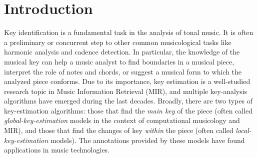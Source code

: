 \documentclass[sigconf]{acmart}
\begin{document}



\maketitle

\section{Introduction}
Key identification is a fundamental task in the analysis of tonal music. 
It is often a preliminary or concurrent step to other common musicological tasks like harmonic analysis and cadence detection. 
In particular, the knowledge of the musical key can help a music analyst to find boundaries in a musical piece, interpret the role of notes and chords, or suggest a musical form to which the analyzed piece conforms.
Due to its importance, key estimation is a well-studied research topic in Music Information Retrieval (MIR), and multiple key-analysis algorithms have emerged during the last decades. 
Broadly, there are two types of key-estimation algorithms: those that find the \emph{main key} of the piece (often called \emph{global-key-estimation} models in the context of computational musicology and MIR), and those that find the changes of key \emph{within} the piece (often called \emph{local-key-estimation} models). The annotations provided by these models have found applications in music technologies.
\end{document}
